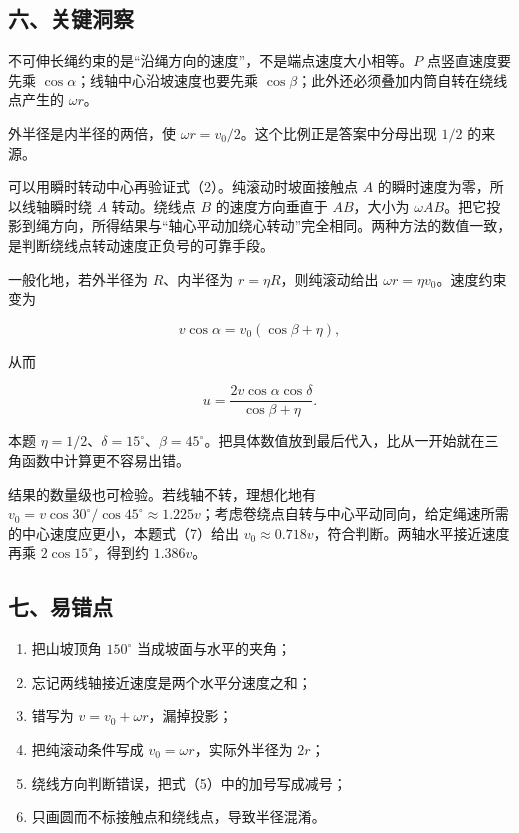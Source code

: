 \documentclass[12pt,a4paper,UTF8]{ctexart}
\newcommand{\tightlist}{\setlength{\itemsep}{0pt}\setlength{\parskip}{0pt}}
\begin{document}
\subsection{六、关键洞察}\label{ux516dux5173ux952eux6d1eux5bdf-3}

不可伸长绳约束的是``沿绳方向的速度''，不是端点速度大小相等。\(P\)
点竖直速度要先乘 \(\cos\alpha\)；线轴中心沿坡速度也要先乘
\(\cos\beta\)；此外还必须叠加内筒自转在绕线点产生的 \(\omega r\)。

外半径是内半径的两倍，使 \(\omega r=v_0/2\)。这个比例正是答案中分母出现
\(1/2\) 的来源。

可以用瞬时转动中心再验证式（2）。纯滚动时坡面接触点 \(A\)
的瞬时速度为零，所以线轴瞬时绕 \(A\) 转动。绕线点 \(B\) 的速度方向垂直于
\(AB\)，大小为
\(\omega AB\)。把它投影到绳方向，所得结果与``轴心平动加绕心转动''完全相同。两种方法的数值一致，是判断绕线点转动速度正负号的可靠手段。

一般化地，若外半径为 \(R\)、内半径为 \(r=\eta R\)，则纯滚动给出
\(\omega r=\eta v_0\)。速度约束变为

\[
v\cos\alpha=v_0(\cos\beta+\eta),
\]

从而

\[
u
=\frac{2v\cos\alpha\cos\delta}
{\cos\beta+\eta}.
\]

本题
\(\eta=1/2\)、\(\delta=15^\circ\)、\(\beta=45^\circ\)。把具体数值放到最后代入，比从一开始就在三角函数中计算更不容易出错。

结果的数量级也可检验。若线轴不转，理想化地有
\(v_0=v\cos30^\circ/\cos45^\circ\approx1.225v\)；考虑卷绕点自转与中心平动同向，给定绳速所需的中心速度应更小，本题式（7）给出
\(v_0\approx0.718v\)，符合判断。两轴水平接近速度再乘
\(2\cos15^\circ\)，得到约 \(1.386v\)。

\subsection{七、易错点}\label{ux4e03ux6613ux9519ux70b9-3}

\begin{enumerate}
\def\labelenumi{\arabic{enumi}.}
\tightlist
\item
  把山坡顶角 \(150^\circ\) 当成坡面与水平的夹角；
\item
  忘记两线轴接近速度是两个水平分速度之和；
\item
  错写为 \(v=v_0+\omega r\)，漏掉投影；
\item
  把纯滚动条件写成 \(v_0=\omega r\)，实际外半径为 \(2r\)；
\item
  绕线方向判断错误，把式（5）中的加号写成减号；
\item
  只画圆而不标接触点和绕线点，导致半径混淆。
\end{enumerate}
\end{document}
